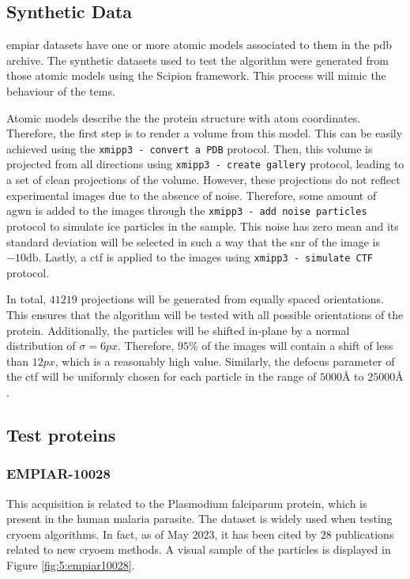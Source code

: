 \documentclass[../main.tex]{subfiles}
\begin{document}
\subsection{Synthetic Data}
\Gls{empiar} datasets have one or more atomic models associated to them in the \gls{pdb} archive. The synthetic datasets used to test the algorithm were generated from those atomic models using the Scipion framework\cite{delarosa2016}. This process will mimic the behaviour of the \glspl{tem}.

Atomic models describe the the protein structure with atom coordinates. Therefore, the first step is to render a volume from this model. This can be easily achieved using the \texttt{xmipp3 - convert a PDB} protocol. Then, this volume is projected from all directions using \texttt{xmipp3 - create gallery} protocol, leading to a set of clean projections of the volume. However, these projections do not reflect experimental images due to the absence of noise. Therefore, some amount of \gls{agwn} is added to the images through the \texttt{xmipp3 - add noise particles} protocol to simulate ice particles in the sample. This noise has zero mean and its standard deviation will be selected in such a way that the \gls{snr} of the image is $-10 \si{\decibel}$. Lastly, a \gls{ctf} is applied to the images using \texttt{xmipp3 - simulate CTF} protocol. 

In total, $41219$ projections will be generated from equally spaced orientations. This ensures that the algorithm will be tested with all possible orientations of the protein. Additionally, the particles will be shifted in-plane by a normal distribution of $\sigma=6\si{px}$. Therefore, $95\si{\percent}$ of the images will contain a shift of less than $12 \si{px}$, which is a reasonably high value. Similarly, the defocus parameter of the \gls{ctf} will be uniformly chosen for each particle in the range of $5000 \si{\angstrom}$ to $25000 \si{\angstrom}$.


\subsection{Test proteins}
\subsubsection{EMPIAR-10028}
This acquisition is related to the Plasmodium falciparum protein, which is present in the human malaria parasite\cite{wong2014}\cite{empiar10028}. The dataset is widely used when testing \gls{cryoem} algorithms. In fact, as of May 2023, it has been cited by $28$ publications related to new \gls{cryoem} methods. A visual sample of the particles is displayed in Figure \ref{fig:5:empiar10028}.
\end{document}
